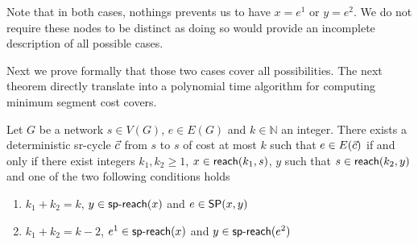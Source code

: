 Note that in both cases, nothings prevents us to have $x = e^1$ or $y = e^2$. We do not require these nodes to be distinct
as doing so would provide an incomplete description of all possible cases.

Next we prove formally that those two cases cover all possibilities. The next theorem directly translate into
a polynomial time algorithm for computing minimum segment cost covers.

\begin{theorem}
\label{thm:edge-cover}
Let $G$ be a network $s \in V(G)$, $e \in E(G)$ and $k \in \mathbb{N}$ an integer. There exists a deterministic sr-cycle $\sr{c}$
from $s$ to $s$ of cost at most $k$ such that $e \in E(\sr{c})$ if and only if there exist integers $k_1, k_2 \geq 1$, $x \in \nreach(k_1, s)$, $y$ such that $s \in \nreach(k_2, y)$ 
and one of the two following conditions holds
\begin{enumerate}[(1)]
 \item $k_1 + k_2 = k$, $y \in \spreach(x)$ and $e \in \sp(x, y)$
 \item $k_1 + k_2 = k - 2$, $e^1 \in \spreach(x)$ and $y \in \spreach(e^2)$
\end{enumerate}
\end{theorem}

